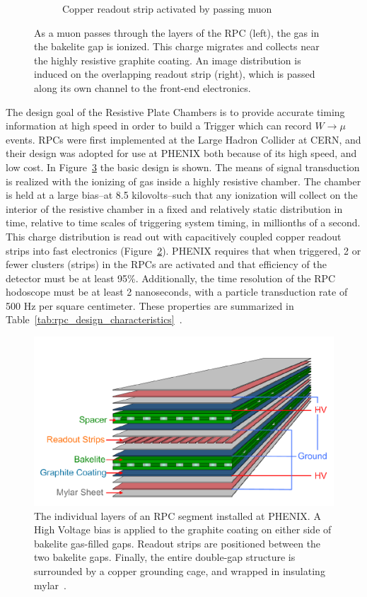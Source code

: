 \begin{figure}
\begin{subfigure}[b]{0.4\textwidth}
    \caption{Copper readout strip activated by passing muon}
    \label{fig:rpc_hit_top_view}
  \end{subfigure}
  \caption{
    As a muon passes through the layers of the RPC (left), the gas in the
    bakelite gap is ionized. This charge migrates and collects near the highly
    resistive graphite coating. An image distribution is induced on the
    overlapping readout strip (right), which is passed along its own channel to
    the front-end electronics.
  }
  \label{fig:muon_hit_rpc}
\end{figure}

The design goal of the Resistive Plate Chambers is to provide accurate timing
information at high speed in order to build a Trigger which can record
$W\rightarrow\mu$ events. RPCs were first implemented at the Large Hadron
Collider at CERN, and their design was adopted for use at PHENIX both because of
its high speed, and low cost. In Figure~\ref{fig:rpc_exploded} the basic design
is shown. The means of signal transduction is realized with the ionizing of gas
inside a highly resistive chamber. The chamber is held at a large bias--at 8.5
kilovolts--such that any ionization will collect on the interior of the
resistive chamber in a fixed and relatively static distribution in time,
relative to time scales of triggering system timing, in millionths of a second.
This charge distribution is read out with capacitively coupled copper readout
strips into fast electronics (Figure~\ref{fig:muon_hit_rpc}). PHENIX requires
that when triggered, 2 or fewer clusters (strips) in the RPCs are activated and
that efficiency of the detector must be at least 95\%.  Additionally, the time
resolution of the RPC hodoscope must be at least 2 nanoseconds, with a particle
transduction rate of 500 Hz per square centimeter.  These properties are
summarized in Table~\ref{tab:rpc_design_characteristics}~\cite{Fukao2011}.

\begin{figure}[ht]
  \centering
  \includegraphics[width=0.7\linewidth]{./figures/rpc_exploded.png}
  \caption{
    The individual layers of an RPC segment installed at PHENIX. A High Voltage
    bias is applied to the graphite coating on either side of bakelite
    gas-filled gaps. Readout strips are positioned between the two bakelite
    gaps. Finally, the entire double-gap structure is surrounded by a copper
    grounding cage, and wrapped in insulating mylar~\cite{Fukao2011}.
  }
  \label{fig:rpc_exploded}
\end{figure}

